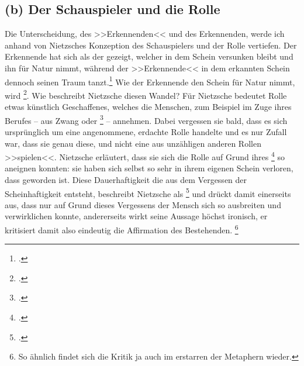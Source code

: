 \documentclass[12pt, a4paper, openany]{report}
\begin{document}
\subsection{(b) Der Schauspieler und die Rolle}
Die Unterscheidung, des >>Erkennenden<< und des Erkennenden, werde ich anhand von Nietzsches Konzeption des Schauspielers und der Rolle vertiefen. 
Der Erkennende hat sich als der gezeigt, welcher in dem Schein versunken bleibt und ihn für Natur nimmt, während der >>Erkennende<< in dem erkannten Schein dennoch seinen Traum tanzt.\footcite[Vgl.][417]{nietzsche_morgenrote_1999}
Wie der Erkennende den Schein für Natur nimmt, wird \footcite[][595]{nietzsche_morgenrote_1999}.
Wie beschreibt Nietzsche diesen Wandel?
Für Nietzsche bedeutet Rolle etwas künstlich Geschaffenes, welches die Menschen, zum Beispiel im Zuge ihres Berufes -- aus Zwang oder \footcite[][595]{nietzsche_morgenrote_1999} -- annehmen. 
Dabei vergessen sie bald, dass es sich ursprünglich um eine angenommene, erdachte Rolle handelte und es nur Zufall war, dass sie genau diese, und nicht eine aus unzähligen anderen Rollen >>spielen<<.
Nietzsche erläutert, dass sie sich die Rolle auf Grund ihres \footcite[][595]{nietzsche_morgenrote_1999} so aneignen konnten:
sie haben sich selbst so sehr in ihrem eigenen Schein verloren, dass  geworden ist. 
Diese Dauerhaftigkeit die aus dem Vergessen der Scheinhaftigkeit entsteht, beschreibt Nietzsche als \footcite[][595]{nietzsche_morgenrote_1999} und drückt damit einerseits aus, dass nur auf Grund dieses Vergessens der Mensch sich so ausbreiten und verwirklichen konnte, andererseits wirkt seine Aussage höchst ironisch, er kritisiert damit also eindeutig die Affirmation des Bestehenden.%
\footnote{
    So ähnlich findet sich die Kritik ja auch im erstarren der Metaphern wieder.
}\\ 
\end{document}
